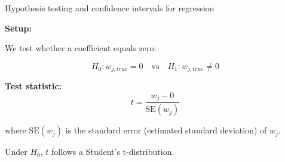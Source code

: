 \documentclass{beamer}
\begin{document}
\begin{frame}{Hypothesis testing and confidence intervals for regression}

\textbf{Setup:}

We test whether a coefficient equals zero:

\[
H_0: w_{j,true} = 0 \quad \text{vs} \quad H_1: w_{j,true} \neq 0
\]

\vspace{0.3cm}

\textbf{Test statistic:}
\[
t = \frac{w_j - 0}{\text{SE}(w_j)}
\]

where $\text{SE}(w_j)$ is the standard error (estimated standard deviation) of $w_j$.

\vspace{0.3cm}

Under $H_0$, $t$ follows a Student's t-distribution.

\end{frame}
\end{document}
